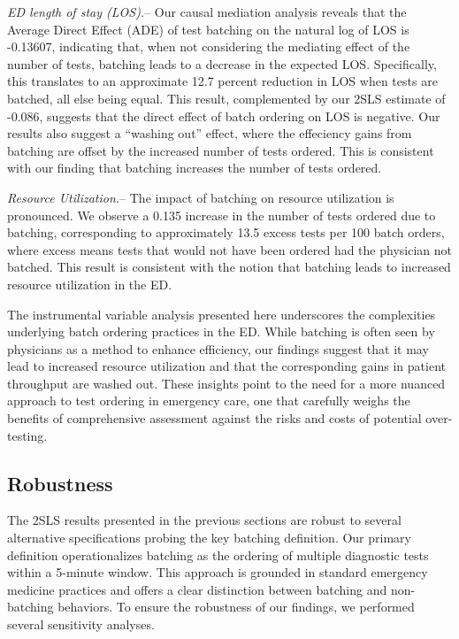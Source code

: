 \documentclass[,,nonblindrev]{informs}
\begin{document}
\emph{ED length of stay (LOS).}-- Our causal mediation analysis reveals
that the Average Direct Effect (ADE) of test batching on the natural log
of LOS is -0.13607, indicating that, when not considering the mediating
effect of the number of tests, batching leads to a decrease in the
expected LOS. Specifically, this translates to an approximate 12.7
percent reduction in LOS when tests are batched, all else being equal.
This result, complemented by our 2SLS estimate of -0.086, suggests that
the direct effect of batch ordering on LOS is negative. Our results also
suggest a ``washing out'' effect, where the effeciency gains from
batching are offset by the increased number of tests ordered. This is
consistent with our finding that batching increases the number of tests
ordered.

\emph{Resource Utilization.}-- The impact of batching on resource
utilization is pronounced. We observe a 0.135 increase in the number of
tests ordered due to batching, corresponding to approximately 13.5
excess tests per 100 batch orders, where excess means tests that would
not have been ordered had the physician not batched. This result is
consistent with the notion that batching leads to increased resource
utilization in the ED.

The instrumental variable analysis presented here underscores the
complexities underlying batch ordering practices in the ED. While
batching is often seen by physicians as a method to enhance efficiency,
our findings suggest that it may lead to increased resource utilization
and that the corresponding gains in patient throughput are washed out.
These insights point to the need for a more nuanced approach to test
ordering in emergency care, one that carefully weighs the benefits of
comprehensive assessment against the risks and costs of potential
over-testing.

\hypertarget{robustness}{%
\subsection{Robustness}\label{robustness}}

The 2SLS results presented in the previous sections are robust to
several alternative specifications probing the key batching definition.
Our primary definition operationalizes batching as the ordering of
multiple diagnostic tests within a 5-minute window. This approach is
grounded in standard emergency medicine practices and offers a clear
distinction between batching and non-batching behaviors. To ensure the
robustness of our findings, we performed several sensitivity analyses.
\end{document}
